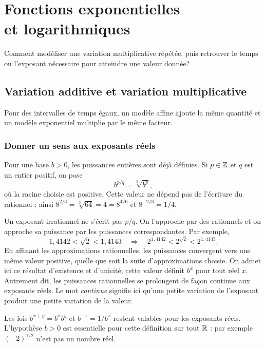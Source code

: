 \chapter[Fonctions exponentielles et logarithmiques]{Fonctions exponentielles\\et logarithmiques}
\label{manual:chapter:06}

\begin{questionbox}
Comment modéliser une variation multiplicative répétée, puis retrouver le temps ou l'exposant nécessaire pour atteindre une valeur donnée?
\end{questionbox}

\section{Variation additive et variation multiplicative}
\label{manual:section:06.01}

\begin{intuitionbox}
Pour des intervalles de temps égaux, un modèle affine ajoute la même quantité et un modèle exponentiel multiplie par le même facteur.
\end{intuitionbox}

\subsection{Donner un sens aux exposants réels}

Pour une base $b>0$, les puissances entières sont déjà définies. Si $p\in\mathbb{Z}$ et $q$ est un entier positif, on pose
\[
b^{p/q}=\sqrt[q]{b^p},
\]
où la racine choisie est positive. Cette valeur ne dépend pas de l'écriture du rationnel : ainsi $8^{2/3}=\sqrt[3]{64}=4=8^{4/6}$ et $8^{-2/3}=1/4$.

Un exposant irrationnel ne s'écrit pas $p/q$. On l'approche par des rationnels et on approche sa puissance par les puissances correspondantes. Par exemple,
\[
1{,}4142<\sqrt2<1{,}4143
\quad\Longrightarrow\quad
2^{1{,}4142}<2^{\sqrt2}<2^{1{,}4143}.
\]
En affinant les approximations rationnelles, les puissances convergent vers une même valeur positive, quelle que soit la suite d'approximations choisie. On admet ici ce résultat d'existence et d'unicité; cette valeur définit $b^x$ pour tout réel $x$. Autrement dit, les puissances rationnelles se prolongent de façon continue aux exposants réels. Le mot \emph{continue} signifie ici qu'une petite variation de l'exposant produit une petite variation de la valeur.

Les lois $b^{x+y}=b^xb^y$ et $b^{-x}=1/b^x$ restent valables pour les exposants réels. L'hypothèse $b>0$ est essentielle pour cette définition sur tout $\mathbb{R}$ : par exemple $(-2)^{1/2}$ n'est pas un nombre réel.

